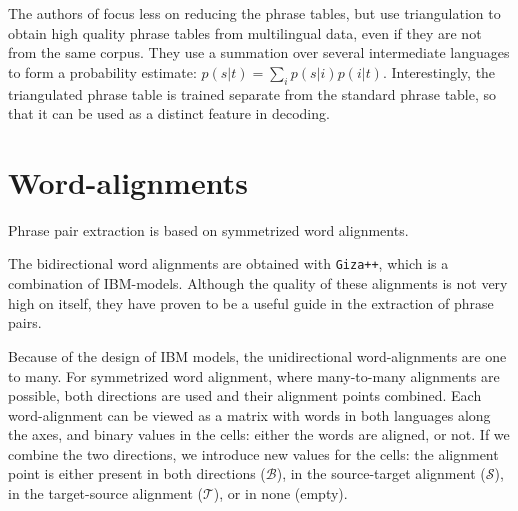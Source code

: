 \documentclass[11pt]{article}
\begin{document}
The authors of \cite{cohn} focus less on reducing the phrase tables, but use triangulation to obtain high quality phrase tables from multilingual data, even if they are not from the same corpus. They use a summation over several intermediate languages to form a probability estimate: $p(s|t)=\sum_i p(s|i)p(i|t)$. Interestingly, the triangulated phrase table is trained separate from the standard phrase table, so that it can be used as a distinct feature in decoding.




\section{Word-alignments}
Phrase pair extraction is based on symmetrized word alignments. 

The bidirectional word alignments are obtained with {\tt Giza++}, which is a combination of IBM-models. Although the quality of these alignments is not very high on itself, they have proven to be a useful guide in the extraction of phrase pairs. 


 Because of the design of IBM models, the unidirectional word-alignments are one to many. For symmetrized word alignment, where many-to-many alignments are possible, both directions are used and their alignment points combined. Each word-alignment can be viewed as a matrix with words in both languages along the axes, and binary values in the cells: either the words are aligned, or not. If we combine the two directions, we introduce new values for the cells: the alignment point is either present in both directions ($\mathcal B$), in the source-target alignment ($\mathcal S$), in the target-source alignment ($\mathcal T$), or in none (empty).
\end{document}
